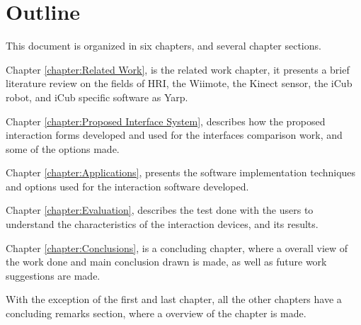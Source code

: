 \section{Outline}

	This document is organized in six chapters, and several chapter sections.
	
	Chapter \ref{chapter:Related Work}, is the related work chapter, it presents a brief literature review on the fields of \ac{HRI}, the \ac{Wiimote}, the Kinect sensor, the iCub robot, and iCub specific software as \ac{Yarp}.
	
	Chapter \ref{chapter:Proposed Interface System}, describes how the proposed interaction forms developed and used for the interfaces comparison work, and some of the options made.
	
	Chapter \ref{chapter:Applications}, presents the software implementation techniques and options used for the interaction software developed.
	
	Chapter \ref{chapter:Evaluation}, describes the test done with the users to understand the characteristics of the interaction devices, and its results.
	
	Chapter \ref{chapter:Conclusions}, is a concluding chapter, where a overall view of the work done and main conclusion drawn is made, as well as future work suggestions are made.
	
	With the exception of the first and last chapter, all the other chapters have a concluding remarks section, where a overview of the chapter is made.
	